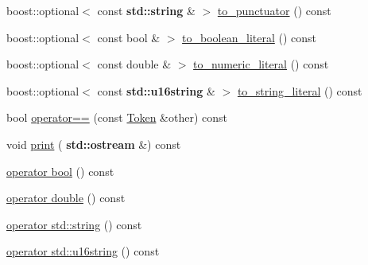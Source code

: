 \begin{DoxyCompactItemize}
\item 
boost\+::optional$<$ const \textbf{ std\+::string} \& $>$ \hyperlink{class_token_af444d77cf7f485541298bdab14ef31d7}{to\+\_\+punctuator} () const
\item 
boost\+::optional$<$ const bool \& $>$ \hyperlink{class_token_a6b583ee8d826950108c7e65b18aca33b}{to\+\_\+boolean\+\_\+literal} () const
\item 
boost\+::optional$<$ const double \& $>$ \hyperlink{class_token_ab0d3c8f7d81bf3047ab6554f37d81c39}{to\+\_\+numeric\+\_\+literal} () const
\item 
boost\+::optional$<$ const \textbf{ std\+::u16string} \& $>$ \hyperlink{class_token_aa418feead325e2dc8a03c36f912ece70}{to\+\_\+string\+\_\+literal} () const
\item 
bool \hyperlink{class_token_a20c14983ac6c11ffb89135e2cd91169f}{operator==} (const \hyperlink{class_token}{Token} \&other) const
\item 
void \hyperlink{class_token_a50f3ddd1f75c6ae38e0156dd16796a9e}{print} (\textbf{ std\+::ostream} \&) const
\item 
\hyperlink{class_token_a34140d60656a12bbfcdfbcf85e985133}{operator bool} () const
\item 
\hyperlink{class_token_a9d9ecf295a7bb23922db6ea5b9e97833}{operator double} () const
\item 
\hyperlink{class_token_a37a03ca940a3abaec1491c9306bafa2a}{operator std\+::string} () const
\item 
\hyperlink{class_token_a4a746b837b7c624604a093eef1e88b12}{operator std\+::u16string} () const
\end{DoxyCompactItemize}
